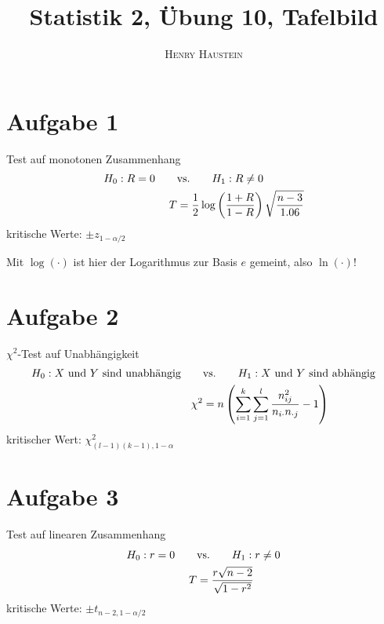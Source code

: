 \documentclass{article}
\title{\textbf{Statistik 2, Übung 10, Tafelbild}}
\author{\textsc{Henry Haustein}}
\date{}
\begin{document}
	\maketitle
	
	\section*{Aufgabe 1}
	Test auf monotonen Zusammenhang
	\begin{align}
		H_0: R = 0 \qquad&\text{vs.}\qquad H_1: R \neq 0 \notag \\
		T &= \frac{1}{2}\log\left(\frac{1+R}{1-R}\right)\sqrt{\frac{n-3}{1.06}} \notag
	\end{align}
	kritische Werte: $\pm z_{1-\alpha/2}$
	
	Mit $\log(\cdot)$ ist hier der Logarithmus zur Basis $e$ gemeint, also $\ln(\cdot)$!
	
	\section*{Aufgabe 2}
	$\chi^2$-Test auf Unabhängigkeit
	\begin{align}
		H_0: \text{$X$ und $Y$ sind unabhängig} \qquad&\text{vs.}\qquad H_1:\text{$X$ und $Y$ sind abhängig} \notag \\
		\chi^2 &= n\left(\sum_{i=1}^{k}\sum_{j=1}^{l} \frac{n_{ij}^2}{n_{i\cdot}n_{\cdot j}} - 1\right) \notag
	\end{align}
	kritischer Wert: $\chi^2_{(l-1)(k-1),1-\alpha}$
	
	\section*{Aufgabe 3}	
	Test auf linearen Zusammenhang
	\begin{align}
		H_0: r = 0 \qquad&\text{vs.}\qquad H_1: r \neq 0 \notag \\
		T &= \frac{r\sqrt{n-2}}{\sqrt{1-r^2}} \notag
	\end{align}
	kritische Werte: $\pm t_{n-2,1-\alpha/2}$
	
\end{document}
